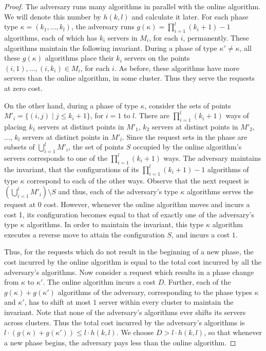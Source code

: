 \documentclass[11pt]{article}
\theoremstyle{plain}\newtheorem{theorem}{Theorem}
\theoremstyle{definition}
\theoremstyle{remark}
\DeclareMathOperator{\suchthat}{\text{ }|\text{ }}
\begin{document}
\begin{proof}
The adversary runs many algorithms in parallel with the online algorithm. We will denote this number by $h(k,l)$ and calculate it later. For each phase type $\kappa=(k_1,\ldots,k_l)$, the adversary runs $g(\kappa)=\prod_{i=1}^l(k_i+1)-1$ algorithms, each of which has $k_i$ servers in $M_i$, for each $i$, permanently. These algorithms maintain the following invariant. During a phase of type $\kappa'\neq\kappa$, all these $g(\kappa)$ algorithms place their $k_i$ servers on the points $(i,1),\ldots,(i,k_i)\in M_i$, for each $i$. As before, these algorithms have more servers than the online algorithm, in some cluster. Thus they serve the requests at zero cost.

On the other hand, during a phase of type $\kappa$, consider the sets of points $M'_i=\{(i,j)\suchthat j\leq k_i+1\}$, for $i=1$ to $l$. There are $\prod_{i=1}^l(k_i+1)$ ways of placing $k_1$ servers at distinct points in $M'_1$, $k_2$ servers at distinct points in $M'_2$, $\ldots$, $k_l$ servers at distinct points in $M'_l$. Since the request sets in the phase are subsets of $\bigcup_{i=1}^lM'_i$, the set of points $S$ occupied by the online algorithm's servers corresponds to one of the $\prod_{i=1}^l(k_i+1)$ ways. The adversary maintains the invariant, that the configurations of its $\prod_{i=1}^l(k_i+1)-1$ algorithms of type $\kappa$ correspond to each of the other ways. Observe that the next request is $\left(\bigcup_{i=1}^lM'_i\right)\setminus S$ and thus, each of the adversary's type $\kappa$ algorithms serves the request at $0$ cost. However, whenever the online algorithm moves and incurs a cost 1, its configuration becomes equal to that of exactly one of the adversary's type $\kappa$ algorithms. In order to maintain the invariant, this type $\kappa$ algorithm executes a reverse move to attain the configuration $S$, and incurs a cost $1$.

Thus, for the requests which do not result in the beginning of a new phase, the cost incurred by the online algorithm is equal to the total cost incurred by all the adversary's algorithms. Now consider a request which results in a phase change from $\kappa$ to $\kappa'$. The online algorithm incurs a cost $D$. Further, each of the $g(\kappa)+g(\kappa')$ algorithms of the adversary, corresponding to the phase types $\kappa$ and $\kappa'$, has to shift at most $1$ server within every cluster to maintain the invariant. Note that none of the adversary's algorithms ever shifts its servers across clusters. Thus the total cost incurred by the adversary's algorithms is $l\cdot(g(\kappa)+g(\kappa'))\leq l\cdot h(k,l)$. We choose $D>l\cdot h(k,l)$, so that whenever a new phase begins, the adversary pays less than the online algorithm.


\end{proof}
\end{document}
